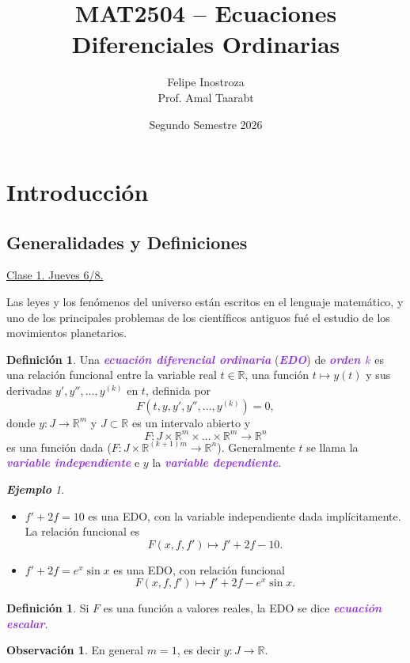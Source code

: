 \documentclass{article}
\title{MAT2504 -- Ecuaciones Diferenciales Ordinarias}
\author{Felipe Inostroza \\ Prof. Amal Taarabt}
\date{Segundo Semestre 2026}
\theoremstyle{definition}
\newtheorem{definition}[theorem]{Definición}
\newtheorem*{obs}{Observación}
\theoremstyle{remark}
\newtheorem{example}[theorem]{\textbf{Ejemplo}}
\numberwithin{equation}{section}
\newcommand{\R}{\mathbb{R}}
\newcommand{\wea}[1]{\textcolor{BlueViolet}{\textbf{\emph{#1}}}}
\newcommand{\fecha}[1]{\begin{flushright} \underline{#1} \end{flushright}}
\begin{document}
\maketitle
\tableofcontents

\newpage

\section{Introducción}
\subsection{Generalidades y Definiciones}
\fecha{Clase 1. Jueves 6/8.}

Las leyes y los fenómenos del universo están escritos en el lenguaje matemático, y uno de los principales problemas de los científicos antiguos fué el estudio de los movimientos planetarios.

\begin{definition}
    Una \wea{ecuación diferencial ordinaria} (\wea{EDO}) de \wea{orden $k$} es una relación funcional entre la variable real $t \in \R$, una función $t \mapsto y(t)$ y sus derivadas $y', y'', \dots, y^{(k)}$ en $t$, definida por
    \[ F(t,y,y',y'',\dots,y^{(k)}) = 0, \tag{1} \]
    donde $y \colon J \to \R^m$ y $J \subset \R$ es un intervalo abierto y 
    \[ F \colon J \times \R^m \times \dots \times \R^m \to \R^n \]
    es una función dada ($F \colon J \times \R^{(k+1)m} \to \R^n$).
    Generalmente $t$ se llama la \wea{variable independiente} e $y$ la \wea{variable dependiente}.
\end{definition}

\begin{example}\
    \begin{itemize}
        \item $f' + 2f = 10$ es una EDO, con la variable independiente dada implícitamente. La relación funcional es
        \[ F(x,f,f') \mapsto f' + 2f - 10. \]
        \item $f' + 2f = e^x \sin x$ es una EDO, con relación funcional
        \[ F(x,f,f') \mapsto f' + 2f - e^x \sin x. \]
    \end{itemize}
\end{example}

\begin{definition}
    Si $F$ es una función a valores reales, la EDO se dice \wea{ecuación escalar}.
\end{definition}

\begin{obs}
    En general $m = 1$, es decir $y \colon J \to \R$.
\end{obs}
\end{document}
